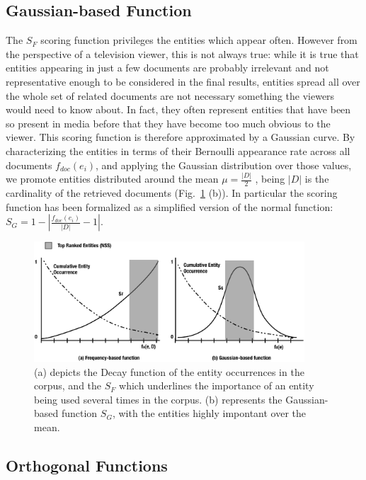 \documentclass{llncs}
\begin{document}
\subsection{Gaussian-based Function}
The $S_F$ scoring function privileges the entities which appear often. However from the perspective of a television viewer, this is not always true: while it is true that entities appearing in just a few documents are probably irrelevant and not representative enough to be considered in the final results, entities spread all over the whole set of related documents are not necessary something the viewers would need to know about. In fact, they often represent entities that have been so present in media before that they have become too much obvious to the viewer. This scoring function is therefore approximated by a Gaussian curve.
By characterizing the entities in terms of their Bernoulli appearance rate across all documents $f_{doc}(e_i)$, and applying the Gaussian distribution over those values, we  promote entities distributed around the mean $\mu = \frac{|D|}{2}$ , being $|D|$ is the cardinality of the retrieved documents (Fig.~\ref{fig:rankingStrategies} (b)). In particular the scoring function has been formalized as a simplified version of the normal function: $S_G = 1-\left | \frac{ f_{doc}(e_i) }{|D|} -1 \right |$.
\begin{figure}[h!]
\centering
\includegraphics[width=0.9\textwidth]{figure/RankingStrategies}
\caption{(a) depicts the Decay function of the entity occurrences in the corpus, and the $S_F$ which underlines the importance of an entity being used several times in the corpus. (b) represents the Gaussian-based function $S_G$, with the entities highly impontant over the mean.}
\label{fig:rankingStrategies}%
\end{figure}



\subsection{Orthogonal Functions}
\end{document}
